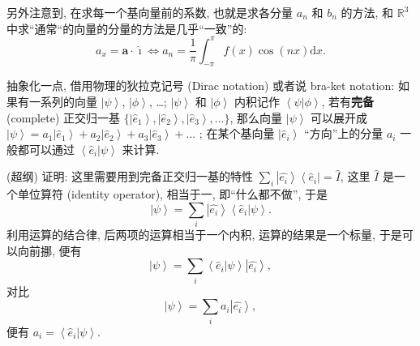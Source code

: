 另外注意到, 在求每一个基向量前的系数, 也就是求各分量 $a_n$ 和 $b_n$
的方法, 和 $\mathbb{R}^3$
中求``通常``的向量的分量的方法是几乎``一致''的: \[
a_x=\boldsymbol{a}\cdot\hat{\imath}\Leftrightarrow a_n=\frac{1}{\pi}\int_{-\pi}^\pi f(x)\cos(nx)\mathrm{d}x.
\]

\begin{newquote}
抽象化一点, 借用物理的狄拉克记号 (Dirac notation) 或者说 bra-ket
notation: 如果有一系列的向量 $\left|\psi\right>$,
$\left|\phi\right>$, \ldots; $\left|\psi\right>$ 和
$\left|\phi\right>$ 内积记作 $\left<\psi\right.\left|\phi\right>$,
若有\textbf{完备} (complete) 正交归一基
$\{\left|\hat{e}_1\right>,\left|\hat{e}_2\right>,\left|\hat{e}_3\right>,...\}$,
那么向量 $\left|\psi\right>$ 可以展开成
$\left|\psi\right>=a_1\left|\hat{e}_1\right>+a_2\left|\hat{e}_2\right>+a_3\left|\hat{e}_3\right>+...$
; 在某个基向量 $\left|\hat{e}_i\right>$ ``方向''上的分量 $a_i$
一般都可以通过 $\left<\hat{e}_i\right.\left|\psi\right>$ 来计算.

(超纲) 证明: 这里需要用到完备正交归一基的特性
$\sum_i\left|\hat{e_i}\right>\left<\hat{e}_i\right|=\hat{I}$, 这里
$\hat{I}$ 是一个单位算符 (identity operator), 相当于一,
即``什么都不做'', 于是 \[
\left|\psi\right>=\sum_i\left|\hat{e_i}\right>\left<\hat{e}_i\right.\left|\psi\right>.
\] 利用运算的结合律, 后两项的运算相当于一个内积, 运算的结果是一个标量,
于是可以向前挪, 便有 \[
\left|\psi\right>=\sum_i\left<\hat{e}_i\right.\left|\psi\right>\left|\hat{e_i}\right>,
\] 对比 \[
\left|\psi\right>=\sum_ia_i\left|\hat{e_i}\right>,
\] 便有 $a_i=\left<\hat{e}_i\right.\left|\psi\right>$.
\end{newquote}